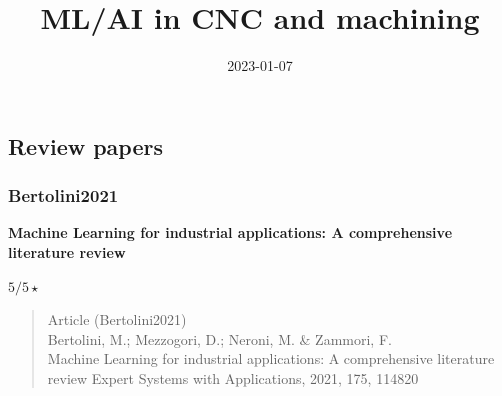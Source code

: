 \documentclass[
  letterpaper,
  DIV=11,
  numbers=noendperiod]{scrartcl}
\title{ML/AI in CNC and machining}
\author{}
\date{2023-01-07}
\renewcommand*\contentsname{Table of contents}
\newcommand\contentsname{Table of contents}
\begin{document}
\maketitle

\renewcommand*\contentsname{Table of contents}
{
\hypersetup{linkcolor=}
\setcounter{tocdepth}{3}
\tableofcontents
}

\subsection{Review papers}\label{review-papers}

\subsubsection{Bertolini2021}\label{bertolini2021}

\textbf{Machine Learning for industrial applications: A comprehensive
literature review}

\(5/5 \star\)

\begin{quote}
Article (Bertolini2021)\\
Bertolini, M.; Mezzogori, D.; Neroni, M. \& Zammori, F.\\
Machine Learning for industrial applications: A comprehensive literature
review Expert Systems with Applications, 2021, 175, 114820
\end{quote}
\end{document}
